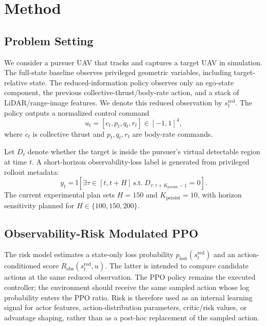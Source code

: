 \documentclass[lettersize,journal]{IEEEtran}
\begin{document}
\section{Method}

\subsection{Problem Setting}

We consider a pursuer UAV that tracks and captures a target UAV in simulation. The full-state baseline observes privileged geometric variables, including target-relative state. The reduced-information policy observes only an ego-state component, the previous collective-thrust/body-rate action, and a stack of LiDAR/range-image features. We denote this reduced observation by $s_t^{\mathrm{red}}$. The policy outputs a normalized control command
\begin{equation}
  u_t = [c_t, p_t, q_t, r_t] \in [-1,1]^4,
\end{equation}
where $c_t$ is collective thrust and $p_t,q_t,r_t$ are body-rate commands.

Let $D_t$ denote whether the target is inside the pursuer's virtual detectable region at time $t$. A short-horizon observability-loss label is generated from privileged rollout metadata:
\begin{equation}
  y_t =
  \mathbb{I}\left[
    \exists \tau \in [t,t+H] \ \mathrm{s.t.}\
    D_{\tau:\tau+K_{\mathrm{persist}}-1}=0
    \right].
\end{equation}
The current experimental plan sets $H=150$ and $K_{\mathrm{persist}}=10$, with horizon sensitivity planned for $H \in \{100,150,200\}$.

\subsection{Observability-Risk Modulated PPO}

The risk model estimates a state-only loss probability $p_{\mathrm{lost}}(s_t^{\mathrm{red}})$ and an action-conditioned score $R_{\mathrm{obs}}(s_t^{\mathrm{red}},u)$. The latter is intended to compare candidate actions at the same reduced observation. The PPO policy remains the executed controller; the environment should receive the same sampled action whose log probability enters the PPO ratio. Risk is therefore used as an internal learning signal for actor features, action-distribution parameters, critic/risk values, or advantage shaping, rather than as a post-hoc replacement of the sampled action.
\end{document}
